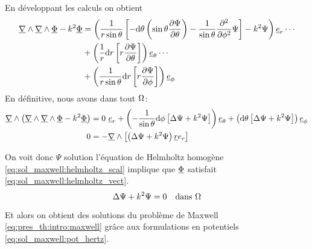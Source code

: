 % 
En développant les calculs on obtient
\begin{align*}
  \underline{\nabla} \wedge \underline{\nabla} \wedge \underline{\Phi} - k^2 \underline{\Phi} 
  &= \left(\dfrac{1}{r\sin\theta}\left[-\mathrm{d}{\theta}\left(\sin\theta\dfrac{\partial \Psi}{\partial \theta}\right)-\dfrac{1}{\sin\theta}\dfrac{\partial^2}{\partial \phi^2}\Psi\right]-k^2\Psi\right)\underline{e}_r \cdots \\
  &+ \left(\dfrac{1}{r}\mathrm{d}{r}\left[r\dfrac{\partial \Psi}{\partial \theta}\right]\right)\underline{e}_\theta \cdots \\
  &+ \left(\dfrac{1}{r\sin\theta}\mathrm{d}{r}\left[r\dfrac{\partial \Psi}{\partial \phi}\right]\right)\underline{e}_\phi
\end{align*}
En définitive, nous avons dans tout $\Omega$:
\begin{align*}
  \rot\left(\rot \rot \v \Phi - k^2 \v \Phi\right) 
  &= %
   0 ~ \v e_r 
  + \left(-\frac{1}{\sin\theta}\dd{\phi}\left[\Delta \Psi + k^2 \Psi \right]\right)\v e_\theta 
  + \left(\dd{\theta}\left[\Delta \Psi + k^2 \Psi \right]\right)\v e_\phi \\
  0 &= -\rot \left[ \left(\Delta \Psi + k^2\Psi\right)\v r e_r\right]
\end{align*}

On voit donc $\Psi$ solution l'équation de Helmholtz homogène  \eqref{eq:sol_maxwell:helmholtz_scal} implique que $\underline{\Phi}$ satisfait \eqref{eq:sol_maxwell:helmholtz_vect}.
\begin{equation}
  \label{eq:sol_maxwell:helmholtz_scal}
   \Delta \Psi + k^2\Psi = 0 \quad \text{dans $\Omega$}
\end{equation}

Et alors on obtient des solutions du problème de Maxwell \eqref{eq:pres_th:intro:maxwell} grâce aux formulations en potentiels \eqref{eq:sol_maxwell:pot_hertz}.
